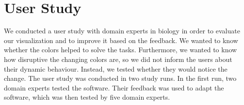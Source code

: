 \documentclass[review,journal]{vgtc}         %
\begin{document}
	
	\section{User Study}
	\label{sec:study}
	We conducted a user study with domain experts in biology in order to evaluate our visualization and to improve it based on the feedback.
	We wanted to know whether the colors helped to solve the tasks.
	Furthermore, we wanted to know how disruptive the changing colors are, so we did not inform the users about their dynamic behaviour. 
	Instead, we tested whether they would notice the change.
	The user study was conducted in two study runs. 
	In the first run, two domain experts tested the software. 
	Their feedback was used to adapt the software, which was then tested by five domain experts.
	
\end{document}
